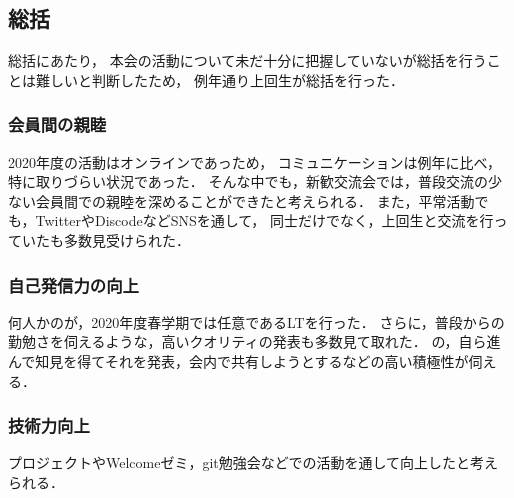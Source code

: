 \subsection*{\firstGrade{}総括}



\firstGrade{}総括にあたり，
本会の活動について未だ十分に把握していない\firstGrade{}が総括を行うことは難しいと判断したため，
例年通り上回生が総括を行った．


\subsubsection*{会員間の親睦}
2020年度の活動はオンラインであっため，
コミュニケーションは例年に比べ，特に取りづらい状況であった．
そんな中でも，新歓交流会では，普段交流の少ない会員間での親睦を深めることができたと考えられる．
また，平常活動でも，TwitterやDiscodeなどSNSを通して，
\firstGrade{}同士だけでなく，上回生と交流を行っていた\firstGrade{}も多数見受けられた．


\subsubsection*{自己発信力の向上}
何人かの\firstGrade{}が，2020年度春学期では任意であるLTを行った．
さらに，普段からの勤勉さを伺えるような，高いクオリティの発表も多数見て取れた．
\firstGrade{}の，自ら進んで知見を得てそれを発表，会内で共有しようとするなどの高い積極性が伺える．


\subsubsection*{技術力向上}
プロジェクトやWelcomeゼミ，git勉強会などでの活動を通して向上したと考えられる．
